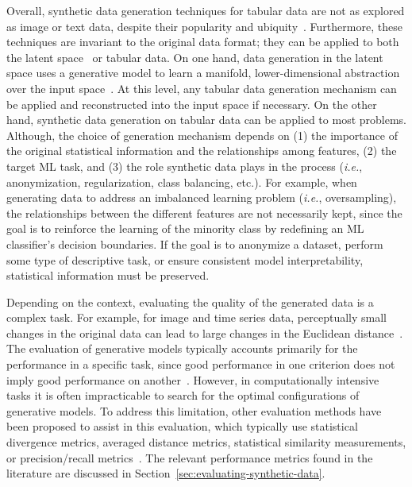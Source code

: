 Overall, synthetic data generation techniques for tabular data are not as
explored as image or text data, despite their popularity and
ubiquity~\cite{fakoor2020fast}. Furthermore, these techniques are invariant to
the original data format; they can be applied to both the latent
space~\cite{DeVries2017} or tabular data. On one hand, data generation
in the latent space uses a generative model to learn a manifold,
lower-dimensional abstraction over the input
space~\cite{kingma2019introduction}. At
this level, any tabular data generation mechanism can be applied and
reconstructed into the input space if necessary. On the other hand, synthetic
data generation on tabular data can be applied to most problems. Although, the
choice of generation mechanism depends on (1) the importance of the original
statistical information and the relationships among features, (2) the target
ML task, and (3) the role synthetic data plays in the process (\textit{i.e.},
anonymization, regularization, class balancing, etc.).  For example, when
generating data to address an imbalanced learning problem (\textit{i.e.},
oversampling), the relationships between the different features are not
necessarily kept, since the goal is to reinforce the learning of the minority
class by redefining an ML classifier's decision boundaries. If the goal is to
anonymize a dataset, perform some type of descriptive task, or ensure
consistent model interpretability, statistical information must be preserved.

Depending on the context, evaluating the quality of the generated data is a
complex task. For example, for image and time series data, perceptually small
changes in the original data can lead to large changes in the Euclidean
distance~\cite{assefa2020generating, theis2016note}. The evaluation of
generative models typically accounts primarily for the performance in a
specific task, since good performance in one criterion does not imply good
performance on another~\cite{theis2016note}. However, in computationally
intensive tasks it is often impracticable to search for the optimal
configurations of generative models. To address this limitation, other
evaluation methods have been proposed to assist in this evaluation, which
typically use statistical divergence metrics, averaged distance metrics,
statistical similarity measurements, or precision/recall
metrics~\cite{chundawat2022tabsyndex, alaa2022faithful}. The relevant
performance metrics found in the literature are discussed in
Section~\ref{sec:evaluating-synthetic-data}.

